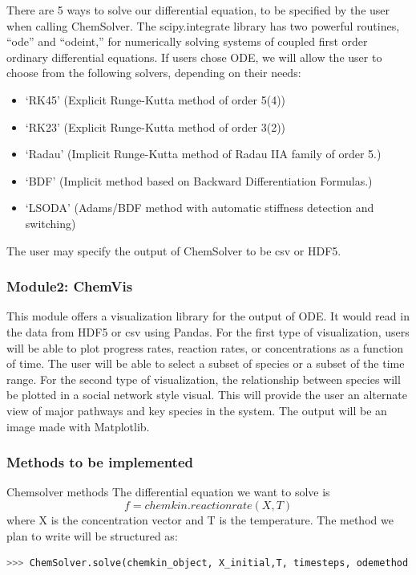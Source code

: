 \documentclass[12pt]{article}
\begin{document}
 There are 5 ways to solve our differential equation, to be specified by the user when calling ChemSolver. The scipy.integrate library has two powerful routines, “ode” and “odeint,” for numerically solving systems of coupled first order ordinary differential equations. If users chose ODE, we will allow the user to choose from the following solvers, depending on their needs:
 \begin{itemize}
\item ‘RK45’ (Explicit Runge-Kutta method of order 5(4))
\item ‘RK23’ (Explicit Runge-Kutta method of order 3(2))
\item ‘Radau’ (Implicit Runge-Kutta method of Radau IIA family of order 5.)
\item ‘BDF’ (Implicit method based on Backward Differentiation Formulas.)
\item ‘LSODA’ (Adams/BDF method with automatic stiffness detection and switching)
\end{itemize}
 
The user may specify the output of ChemSolver to be csv or HDF5.
\subsubsection*{Module2: ChemVis}

This module offers a visualization library for the output of ODE. It would read in the data from HDF5 or csv using Pandas. For the first type of visualization, users will be able to plot progress rates, reaction rates, or concentrations as a function of time. The user will be able to select a subset of species or a subset of the time range. For the second type of visualization, the relationship between species will be plotted in a social network style visual. This will provide the user an alternate view of major pathways and key species in the system. The output will be an image made with Matplotlib.  



\subsubsection{Methods to be implemented}
Chemsolver methods
The differential equation we want to solve is
$$f = chemkin.reactionrate(X,T)$$
where X is the concentration vector and T is the temperature. 
The method we plan to write will be structured as:

\begin{lstlisting}[language = Python, basicstyle = \ttfamily, breaklines = True, columns = fullflexible]
>>> ChemSolver.solve(chemkin_object, X_initial,T, timesteps, odemethod = odemethod,  outputmethod = outputmethod, *args)
\end{lstlisting}
\end{document}

